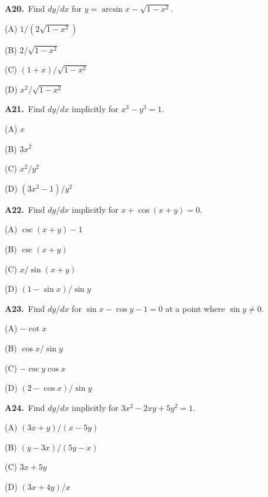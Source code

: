 \documentclass[11pt]{article}
\begin{document}
\bigskip\noindent\textbf{A20.}\ Find $dy/dx$ for $y=\arcsin x-\sqrt{1-x^2}$.
\begin{list}{}{\setlength{\leftmargin}{3em}\setlength{\labelwidth}{2.5em}\setlength{\itemsep}{0pt}\setlength{\topsep}{2pt}}
\item[(A)] $1/(2\sqrt{1-x^2})$
\item[(B)] $2/\sqrt{1-x^2}$
\item[(C)] $(1+x)/\sqrt{1-x^2}$
\item[(D)] $x^2/\sqrt{1-x^2}$
\end{list}

\bigskip\noindent\textbf{A21.}\ Find $dy/dx$ implicitly for $x^3-y^3=1$.
\begin{list}{}{\setlength{\leftmargin}{3em}\setlength{\labelwidth}{2.5em}\setlength{\itemsep}{0pt}\setlength{\topsep}{2pt}}
\item[(A)] $x$
\item[(B)] $3x^2$
\item[(C)] $x^2/y^2$
\item[(D)] $(3x^2-1)/y^2$
\end{list}

\bigskip\noindent\textbf{A22.}\ Find $dy/dx$ implicitly for $x+\cos(x+y)=0$.
\begin{list}{}{\setlength{\leftmargin}{3em}\setlength{\labelwidth}{2.5em}\setlength{\itemsep}{0pt}\setlength{\topsep}{2pt}}
\item[(A)] $\csc(x+y)-1$
\item[(B)] $\csc(x+y)$
\item[(C)] $x/\sin(x+y)$
\item[(D)] $(1-\sin x)/\sin y$
\end{list}

\bigskip\noindent\textbf{A23.}\ Find $dy/dx$ for $\sin x-\cos y-1=0$ at a point where $\sin y\ne0$.
\begin{list}{}{\setlength{\leftmargin}{3em}\setlength{\labelwidth}{2.5em}\setlength{\itemsep}{0pt}\setlength{\topsep}{2pt}}
\item[(A)] $-\cot x$
\item[(B)] $\cos x/\sin y$
\item[(C)] $-\csc y\cos x$
\item[(D)] $(2-\cos x)/\sin y$
\end{list}

\bigskip\noindent\textbf{A24.}\ Find $dy/dx$ implicitly for $3x^2-2xy+5y^2=1$.
\begin{list}{}{\setlength{\leftmargin}{3em}\setlength{\labelwidth}{2.5em}\setlength{\itemsep}{0pt}\setlength{\topsep}{2pt}}
\item[(A)] $(3x+y)/(x-5y)$
\item[(B)] $(y-3x)/(5y-x)$
\item[(C)] $3x+5y$
\item[(D)] $(3x+4y)/x$
\end{list}
\end{document}

